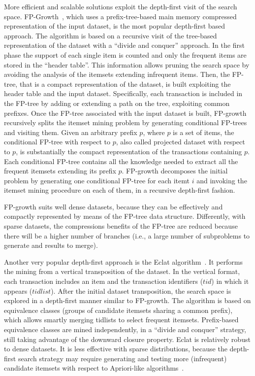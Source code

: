More efficient and scalable solutions exploit the depth-first visit of the search space. 
FP-Growth~\cite{Han00}, which uses a prefix-tree-based main memory compressed representation of the input dataset, is the most popular depth-first based approach. 
The algorithm is based on a recursive visit of the tree-based representation of the dataset with a
``divide and conquer'' approach. In the first phase the support of each single item is
counted and only the frequent items are stored in the ``header table''. This information allows pruning the search space by avoiding the analysis of the itemsets extending infrequent items. Then, the FP-tree, that is a compact representation of the dataset, is built exploiting 
the header table and the input dataset. Specifically, each transaction is included in the FP-tree by adding or
extending a path on the tree, exploiting common prefixes. 
Once the FP-tree associated with the input dataset is built, FP-growth recursively splits the itemset mining problem 
by generating conditional FP-trees and visiting them.  Given an arbitrary prefix $p$, where $p$ is a set of items, the conditional FP-tree with respect to 
$p$, also called projected dataset with respect to $p$, is substantially the compact representation of the transactions containing  $p$. Each conditional FP-tree contains all the knowledge needed to extract all the frequent itemsets extending its prefix $p$. FP-growth decomposes the initial problem by generating one conditional FP-tree for each itemt $i$ and invoking
the itemset mining procedure on each of them, in a recursive depth-first fashion. 


FP-growth suits well dense datasets, because they can be effectively and compactly represented by means of the FP-tree data structure. Differently, with sparse datasets, the compressions benefits of the FP-tree are reduced because there will be a higher number of branches \cite{SurveyHan2007} (i.e., a large number of subproblems to generate and results to merge).

Another very popular depth-first approach is the Eclat algorithm~\cite{Zaki97newalgorithms}.
It performs the mining from a vertical
transposition of the dataset. In the vertical format, each transaction includes an item
and the transaction identifiers ($tid$) in which it appears ($tidlist$).
After the initial dataset
transposition, the search space is explored in a depth-first manner similar to
FP-growth. The algorithm is based on equivalence classes (groups of candidate itemsets
sharing a common prefix),  which allows smartly merging tidlists to select frequent itemsets. 
Prefix-based equivalence classes are mined independently, in a ``divide and conquer'' strategy, still
taking advantage of the downward closure property.
Eclat is relatively robust to dense datasets. It is less effective with sparse distributions, because the depth-first search strategy may require
generating and testing more (infrequent) candidate itemsets with respect to Apriori-like algorithms~\cite{vu2012mining}.

